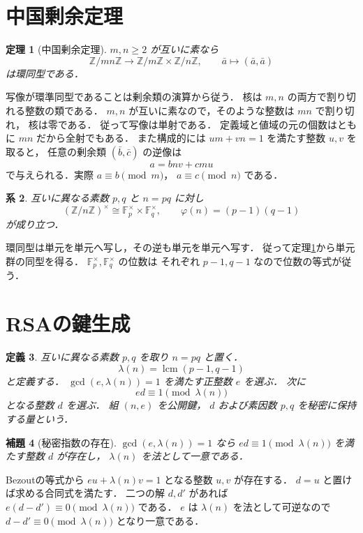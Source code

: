 \documentclass[a5paper,10pt,onecolumn]{jsarticle}
\makeatletter
\theoremstyle{mathnotetheorem}
\newtheorem{theorem}{定理}[section]
\newtheorem{definition}[theorem]{定義}
\newtheorem{lemma}[theorem]{補題}
\newtheorem{corollary}[theorem]{系}
\renewcommand{\proofname}{証明}
\renewenvironment{proof}[1][\proofname]{%
  \par\pushQED{\qed}\normalfont\topsep4\p@\@plus2\p@\relax
  \trivlist\item[\hskip\labelsep\bfseries #1]\ignorespaces
}{\popQED\endtrivlist\@endpefalse}
\makeatother
\begin{document}
\section{中国剰余定理}

\begin{theorem}[中国剰余定理]\label{thm:crt}
$m,n\ge2$ が互いに素なら
\[
 \mathbb Z/mn\mathbb Z
 \longrightarrow
 \mathbb Z/m\mathbb Z\times\mathbb Z/n\mathbb Z,
 \qquad \bar a\longmapsto(\bar a,\bar a)
\]
は環同型である．
\end{theorem}
\begin{proof}
写像が環準同型であることは剰余類の演算から従う．
核は $m,n$ の両方で割り切れる整数の類である．
$m,n$ が互いに素なので，そのような整数は $mn$ で割り切れ，
核は零である．
従って写像は単射である．
定義域と値域の元の個数はともに $mn$ だから全射でもある．
また構成的には $um+vn=1$ を満たす整数 $u,v$ を取ると，
任意の剰余類 $(\bar b,\bar c)$ の逆像は
\[
 a=bnv+cmu
\]
で与えられる．実際 $a\equiv b\pmod m$，
$a\equiv c\pmod n$ である．
\end{proof}

\begin{corollary}\label{cor:unit-group}
互いに異なる素数 $p,q$ と $n=pq$ に対し
\[
 (\mathbb Z/n\mathbb Z)^\times
 \cong\mathbb F_p^\times\times\mathbb F_q^\times,
 \qquad
 \varphi(n)=(p-1)(q-1)
\]
が成り立つ．
\end{corollary}
\begin{proof}
環同型は単元を単元へ写し，その逆も単元を単元へ写す．
従って定理\ref{thm:crt}から単元群の同型を得る．
$\mathbb F_p^\times,\mathbb F_q^\times$ の位数は
それぞれ $p-1,q-1$ なので位数の等式が従う．
\end{proof}

\section{RSAの鍵生成}

\begin{definition}
互いに異なる素数 $p,q$ を取り $n=pq$ と置く．
\[
 \lambda(n)=\operatorname{lcm}(p-1,q-1)
\]
と定義する．
$\gcd(e,\lambda(n))=1$ を満たす正整数 $e$ を選ぶ．
次に
\[
 ed\equiv1\pmod{\lambda(n)}
\]
となる整数 $d$ を選ぶ．
組 $(n,e)$ を\emph{公開鍵}，
$d$ および素因数 $p,q$ を秘密に保持する量という．
\end{definition}

\begin{lemma}[秘密指数の存在]\label{lem:private}
$\gcd(e,\lambda(n))=1$ なら
$ed\equiv1\pmod{\lambda(n)}$ を満たす整数 $d$ が存在し，
$\lambda(n)$ を法として一意である．
\end{lemma}
\begin{proof}
Bezoutの等式から
$eu+\lambda(n)v=1$ となる整数 $u,v$ が存在する．
$d=u$ と置けば求める合同式を満たす．
二つの解 $d,d'$ があれば
$e(d-d')\equiv0\pmod{\lambda(n)}$ である．
$e$ は $\lambda(n)$ を法として可逆なので
$d-d'\equiv0\pmod{\lambda(n)}$ となり一意である．
\end{proof}
\end{document}
